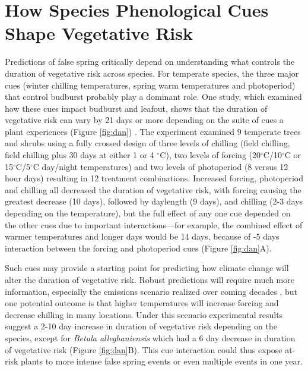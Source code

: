 \documentclass{article}\usepackage[]{graphicx}\usepackage[]{color}
\begin{document}
\section* {How Species Phenological Cues Shape Vegetative Risk}
Predictions of false spring critically depend on understanding what controls the duration of vegetative risk across species. For temperate species, the three major cues (winter chilling temperatures, spring warm temperatures and photoperiod) that control budburst \citep%
{Chuine2010} probably play a dominant role. One study, which examined how these cues impact budburst and leafout, shows that the duration of vegetative risk can vary by 21 days or more depending on the suite of cues a plant experiences (Figure \ref{fig:dan}) \citep{Flynn2018}. The experiment examined 9 temperate trees and shrubs using a fully crossed design of three levels of chilling (field chilling, field chilling plus 30 days at either 1 or 4 $^{\circ}$C), two levels of forcing (20$^{\circ}$C/10$^{\circ}$C or 15$^{\circ}$C/5$^{\circ}$C day/night temperatures) and two levels of photoperiod (8 versus 12 hour days) resulting in 12 treatment combinations. Increased forcing, photoperiod and chilling all decreased the duration of vegetative risk, with forcing causing the greatest decrease (10 days), followed by daylength (9 days), and chilling (2-3 days depending on the temperature), but the full effect of any one cue depended on the other cues due to important interactions---for example, the combined effect of warmer temperatures and longer days would be 14 days, because of -5 days interaction between the forcing and photoperiod cues (Figure \ref{fig:dan}A). 

Such cues may provide a starting point for predicting how climate change will alter the duration of vegetative risk. Robust predictions will require much more information, especially the emissions scenario realized over coming decades \citep{IPCC2014}, but one potential outcome is that higher temperatures will increase forcing and decrease chilling in many locations. Under this scenario experimental results suggest a 2-10 day increase in duration of vegetative risk depending on the species, except for \textit{Betula alleghaniensis} which had a 6 day decrease in duration of vegetative risk (Figure \ref{fig:dan}B).
This cue interaction could thus expose at-risk plants to more intense false spring events or even multiple events in one year. 
\end{document}
